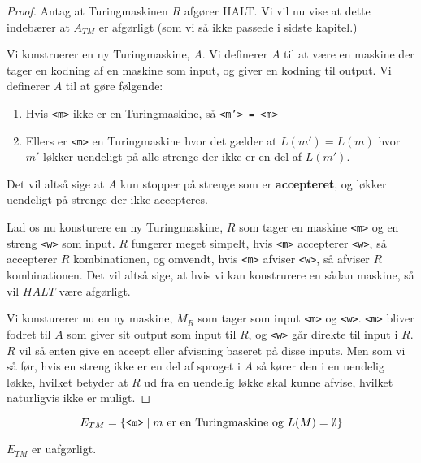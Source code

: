 \begin{proof}
	Antag at Turingmaskinen $R$ afgører HALT. Vi vil nu vise at dette indebærer at $A_{TM}$ er afgørligt (som vi så ikke passede i sidste kapitel.)

	Vi konstruerer en ny Turingmaskine, $A$. Vi definerer $A$ til at være en maskine der tager en kodning af en maskine som input, og giver en kodning til output. Vi definerer $A$ til at gøre følgende:
	\begin{enumerate}
		\item Hvis \texttt{<m>} ikke er en Turingmaskine, så \texttt{<m'> = <m>}
		\item Ellers er \texttt{<m>} en Turingmaskine hvor det gælder at $L(m') = L(
			      m)$ hvor $m'$ løkker uendeligt på alle strenge der ikke er en del af $L(m')$.
	\end{enumerate}

	Det vil altså sige at $A$ kun stopper på strenge som er \textbf{accepteret}, og løkker uendeligt på strenge der ikke accepteres.

	Lad os nu konsturere en ny Turingmaskine, $R$ som tager en maskine \texttt{<m>} og en streng \texttt{<w>} som input. $R$ fungerer meget simpelt, hvis \texttt{<m>} accepterer \texttt{<w>}, så accepterer $R$ kombinationen, og omvendt, hvis \texttt{<m>} afviser \texttt{<w>}, så afviser $R$ kombinationen. Det vil altså sige, at hvis vi kan konstrurere en sådan maskine, så vil $HALT$ være afgørligt.

	Vi konsturerer nu en ny maskine, $M_{R}$ som tager som input \texttt{<m>} og \texttt{<w>}. \texttt{<m>} bliver fodret til $A$ som giver sit output som input til $R$, og \texttt{<w>} går direkte til input i $R$. $R$ vil så enten give en accept eller afvisning baseret på disse inputs. Men som vi så før, hvis en streng ikke er en del af sproget i $A$ så kører den i en uendelig løkke, hvilket betyder at $R$ ud fra en uendelig løkke skal kunne afvise, hvilket naturligvis ikke er muligt.

\end{proof}

\begin{equation*}
	E_{TM} = \{\text{\texttt{<m>}} \mid m \text{ er en Turingmaskine og } L(M) = \emptyset\}
\end{equation*}

\begin{theorem}
	\label{teo:etmundecidable}
	$E_{TM}$ er uafgørligt.
\end{theorem}

